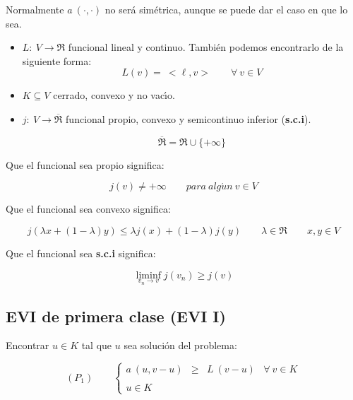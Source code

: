 Normalmente $a\ (\cdot ,\cdot )$ no ser\'a sim\'etrica, aunque se
puede dar el caso en que lo sea.

\begin{itemize}
\item $L  : \ V \longrightarrow \Re $ funcional lineal y continuo. Tambi\'en
podemos encontrarlo de la siguiente forma:
\begin{displaymath}
L  (v) = \ <\ell ,v> \qquad \forall \ v \in V
\end{displaymath}
\item $K \subseteq V$ cerrado, convexo y no vac\'{\i}o.
\item $j : \ V \longrightarrow \overline{\Re}$  funcional propio,
convexo y semicontinuo inferior (\textbf{s.c.i}).

\begin{displaymath}
\overline{\Re} = \Re \cup \{+\infty \}
\end{displaymath}
\end{itemize}

Que el funcional sea propio significa:

\begin{equation} \label{eq:defpropio}
j(v)\neq + \infty \qquad para \ alg\acute{u}n \ v \in V
\end{equation}

Que el funcional sea convexo significa:

\begin{equation} \label{eq:defconvexo}
j(\lambda x + (1- \lambda) y) \le \lambda j(x) + (1-\lambda ) j(y) 
\qquad \lambda \in \Re \qquad x,y \in V
\end{equation} 

Que el funcional sea \textbf{s.c.i} significa:

\begin{equation} \label{eq:defsci}
\liminf_{v_n \to v} j(v_n) \ge j(v)
\end{equation}

\subsection{EVI de primera clase (EVI I)}

Encontrar $u \in K$ tal que $u$ sea soluci\'on del problema:

\begin{equation} \label{eq:EVI2}
(P_1) \qquad \left\{ \begin{array}{lrlr}
a \ (u,v-u) & \ge & L \ (v-u) & \forall \ v \in K \\
\\
u \in K
\end{array} \right.
\end{equation}

